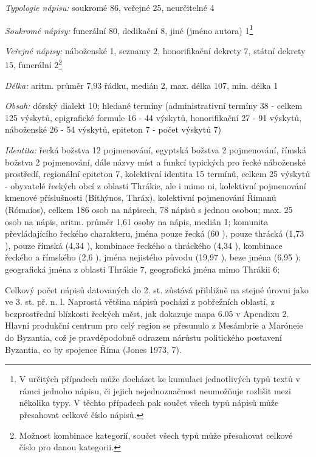{\em Typologie nápisu:} soukromé 86, veřejné 25, neurčitelné 4

{\em Soukromé nápisy:} funerální 80, dedikační 8, jiné (jméno autora) 1\footnote{V určitých případech může docházet ke kumulaci jednotlivých typů textů v rámci jednoho nápisu, či jejich nejednoznačnost neumožňuje rozlišit mezi několika typy. V těchto případech pak součet všech typů nápisů může přesahovat celkové číslo nápisů.}

{\em Veřejné nápisy:} náboženské 1, seznamy 2, honorifikační dekrety 7, státní dekrety 15, funerální 2\footnote{Možnost kombinace kategorií, součet všech typů může přesahovat celkové číslo pro danou kategorii.}

{\em Délka:} aritm. průměr 7,93 řádku, medián 2, max. délka 107, min. délka 1

{\em Obsah:} dórský dialekt 10; hledané termíny (administrativní termíny 38 - celkem 125 výskytů, epigrafické formule 16 - 44 výskytů, honorifikační 27 - 91 výskytů, náboženské 26 - 54 výskytů, epiteton 7 - počet výskytů 7)

{\em Identita:} řecká božstva 12 pojmenování, egyptská božstva 2 pojmenování, římská božstva 2 pojmenování, dále názvy míst a funkcí typických pro řecké náboženské prostředí, regionální epiteton 7, kolektivní identita 15 termínů, celkem 25 výskytů - obyvatelé řeckých obcí z oblasti Thrákie, ale i mimo ni, kolektivní pojmenování kmenové příslušnosti (Bíthýnos, Thráx), kolektivní pojmenování Římanů (Rómaios), celkem 186 osob na nápisech, 78 nápisů s jednou osobou; max. 25 osob na nápis, aritm. průměr 1,61 osoby na nápis, medián 1; komunita převládajícího řeckého charakteru, jména pouze řecká (60 ), pouze thrácká (1,73 ), pouze římská (4,34 ), kombinace řeckého a thráckého (4,34 ), kombinace řeckého a římského (2,6 ), jména nejistého původu (19,97 ), beze jména (6,95 ); geografická jména z oblasti Thrákie 7, geografická jména mimo Thrákii 6;

\NC\AR
\HL
\HL
\stoptable

Celkový počet nápisů datovaných do 2. st. zůstává přibližně na stejné úrovni jako ve 3. st. př. n. l. Naprostá většina nápisů pochází z pobřežních oblastí, z bezprostřední blízkosti řeckých měst, jak dokazuje mapa 6.05 v Apendixu 2. Hlavní produkční centrum pro celý region se přesunulo z Mesámbrie a Maróneie do Byzantia, což je pravděpodobně odrazem nárůstu politického postavení Byzantia, co by spojence Říma (Jones 1973, 7).

